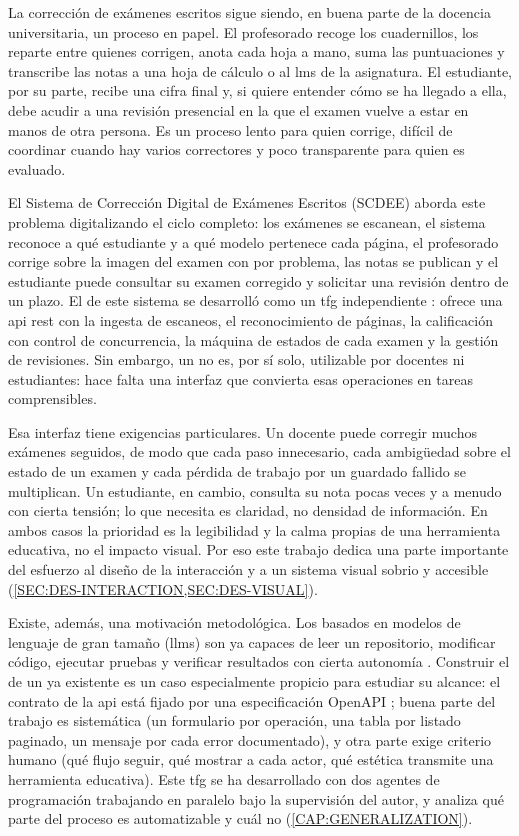 La corrección de exámenes escritos sigue siendo, en buena parte de la docencia
universitaria, un proceso en papel. El profesorado recoge los cuadernillos, los reparte
entre quienes corrigen, anota cada hoja a mano, suma las puntuaciones y transcribe las notas
a una hoja de cálculo o al \acs{lms} de la asignatura. El estudiante, por su parte, recibe
una cifra final y, si quiere entender cómo se ha llegado a ella, debe acudir a una revisión
presencial en la que el examen vuelve a estar en manos de otra persona. Es un proceso lento
para quien corrige, difícil de coordinar cuando hay varios correctores y poco transparente
para quien es evaluado.

El Sistema de Corrección Digital de Exámenes Escritos (SCDEE) aborda este problema
digitalizando el ciclo completo: los exámenes se escanean, el sistema reconoce a qué
estudiante y a qué modelo pertenece cada página, el profesorado corrige sobre la imagen
del examen con  por problema, las notas se publican y el estudiante puede
consultar su examen corregido y solicitar una revisión dentro de un plazo. El
 de este sistema se desarrolló como un \acs{tfg} independiente
\cite{scdee_backend_repo}: ofrece una \acs{api} \acs{rest} con la ingesta de escaneos, el
reconocimiento de páginas, la calificación con control de concurrencia, la máquina de
estados de cada examen y la gestión de revisiones. Sin embargo, un  no es, por
sí solo, utilizable por docentes ni estudiantes: hace falta una interfaz que convierta esas
operaciones en tareas comprensibles.

Esa interfaz tiene exigencias particulares. Un docente puede corregir muchos exámenes
seguidos, de modo que cada paso innecesario, cada ambigüedad sobre el estado de un examen y
cada pérdida de trabajo por un guardado fallido se multiplican. Un estudiante, en cambio,
consulta su nota pocas veces y a menudo con cierta tensión; lo que necesita es claridad,
no densidad de información. En ambos casos la prioridad es la legibilidad y la calma propias
de una herramienta educativa, no el impacto visual. Por eso este trabajo dedica una parte
importante del esfuerzo al diseño de la interacción y a un sistema visual sobrio y
accesible (\cref{SEC:DES-INTERACTION,SEC:DES-VISUAL}).

Existe, además, una motivación metodológica. Los  basados en modelos de
lenguaje de gran tamaño (\acsp{llm}) son ya capaces de leer un repositorio, modificar código,
ejecutar pruebas y verificar resultados con cierta autonomía
\cite{claude_code_docs,openai_codex}. Construir el  de un  ya
existente es un caso especialmente propicio para estudiar su alcance: el contrato de la
\acs{api} está fijado por una especificación OpenAPI \cite{openapi_spec}; buena parte del
trabajo es sistemática (un formulario por operación, una tabla por listado paginado, un
mensaje por cada error documentado), y otra parte exige criterio humano (qué flujo seguir,
qué mostrar a cada actor, qué estética transmite una herramienta educativa). Este
\acs{tfg} se ha desarrollado con dos agentes de programación trabajando en paralelo bajo la
supervisión del autor, y analiza qué parte del proceso es automatizable y cuál no
(\cref{CAP:GENERALIZATION}).
